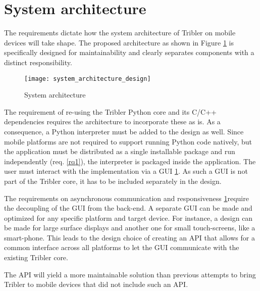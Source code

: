 \section{System architecture}

The requirements dictate how the system architecture of Tribler on mobile devices will take shape.
The proposed architecture as shown in Figure \ref{fig:system_architecture_design} is specifically designed for maintainability and clearly separates components with a distinct responsibility.

\begin{figure}[H]
	\centering
	\texttt{[image: system\_architecture\_design]}
	\caption{System architecture}
	\label{fig:system_architecture_design}
\end{figure}

The requirement of re-using the Tribler Python core and its C/C++ dependencies requires the architecture to incorporate these as is.
As a consequence, a Python interpreter must be added to the design as well.
Since mobile platforms are not required to support running Python code natively, but the application must be distributed as a single installable package and run independently (req. \ref{rq1}), the interpreter is packaged inside the application.
The user must interact with the implementation via a GUI \ref{}.
As such a GUI is not part of the Tribler core, it has to be included separately in the design.

The requirements on asynchronous communication and responsiveness \ref{}require the decoupling of the GUI from the back-end. %
A separate GUI can be made and optimized for any specific platform and target device. %
For instance, a design can be made for large surface displays and another one for small touch-screens, like a smart-phone.
This leads to the design choice of creating an API that allows for a common interface across all platforms to let the GUI communicate with the existing Tribler core.

The API will yield a more maintainable solution than previous attempts to bring Tribler to mobile devices \cite{bsc1,2,3} that did not include such an API.


